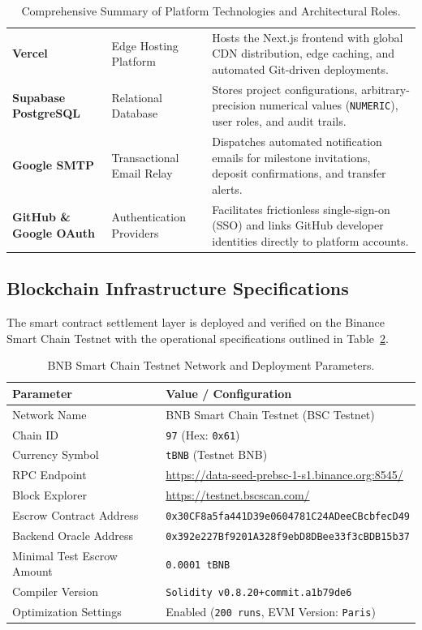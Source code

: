 \documentclass[11pt,a4paper]{article}
\begin{document}
\begin{table}[H]
\begin{tabularx}{\textwidth}{p{3.2cm} p{3.2cm} X}
\textbf{Vercel} & Edge Hosting Platform & Hosts the Next.js frontend with global CDN distribution, edge caching, and automated Git-driven deployments. \\
\textbf{Supabase PostgreSQL} & Relational Database & Stores project configurations, arbitrary-precision numerical values (\texttt{NUMERIC}), user roles, and audit trails. \\
\textbf{Google SMTP} & Transactional Email Relay & Dispatches automated notification emails for milestone invitations, deposit confirmations, and transfer alerts. \\
\textbf{GitHub \& Google OAuth} & Authentication Providers & Facilitates frictionless single-sign-on (SSO) and links GitHub developer identities directly to platform accounts. \\
\bottomrule
\end{tabularx}
\caption{Comprehensive Summary of Platform Technologies and Architectural Roles.}
\label{tab:tech_stack}
\end{table}

\subsection{Blockchain Infrastructure Specifications}
The smart contract settlement layer is deployed and verified on the Binance Smart Chain Testnet with the operational specifications outlined in Table~\ref{tab:bsc_specs}.

\begin{table}[H]
\centering
\small
\begin{tabular}{ll}
\toprule
\textbf{Parameter} & \textbf{Value / Configuration} \\
\midrule
Network Name & BNB Smart Chain Testnet (BSC Testnet) \\
Chain ID & \texttt{97} (Hex: \texttt{0x61}) \\
Currency Symbol & \texttt{tBNB} (Testnet BNB) \\
RPC Endpoint & \url{https://data-seed-prebsc-1-s1.binance.org:8545/} \\
Block Explorer & \url{https://testnet.bscscan.com/} \\
Escrow Contract Address & \texttt{0x30CF8a5fa441D39e0604781C24ADeeCBcbfecD49} \\
Backend Oracle Address & \texttt{0x392e227Bf9201A328f9ebD8DBee33f3cBDB15b37} \\
Minimal Test Escrow Amount & \texttt{0.0001 tBNB} \\
Compiler Version & \texttt{Solidity v0.8.20+commit.a1b79de6} \\
Optimization Settings & Enabled (\texttt{200 runs}, EVM Version: \texttt{Paris}) \\
\bottomrule
\end{tabular}
\caption{BNB Smart Chain Testnet Network and Deployment Parameters.}
\label{tab:bsc_specs}
\end{table}
\end{document}
